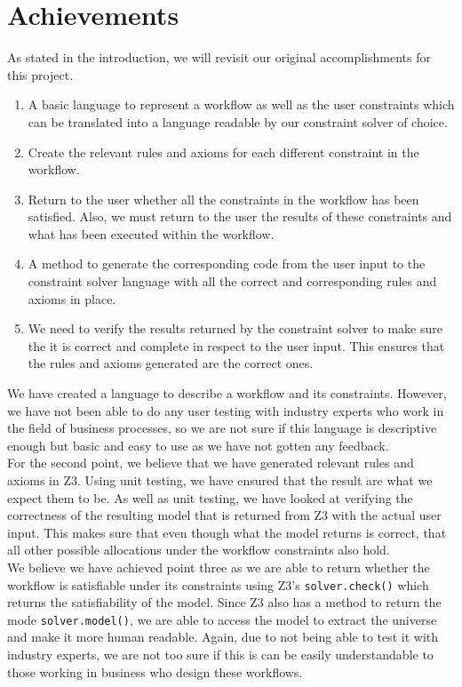 \documentclass[a4paper]{report}
\begin{document}
\section{Achievements}
As stated in the introduction, we will revisit our original accomplishments for this project.
\begin{enumerate}
\item A basic language to represent a workflow as well as the user constraints which can be translated into a language readable by our constraint solver of choice.
\item Create the relevant rules and axioms for each different constraint in the workflow.
\item Return to the user whether all the constraints in the workflow has been satisfied. Also, we must return to the user the results of these constraints and what has been executed within the workflow.
\item A method to generate the corresponding code from the user input to the constraint solver language with all the correct and corresponding rules and axioms in place. 
\item We need to verify the results returned by the constraint solver to make sure the it is correct and complete in respect to the user input. This ensures that the rules and axioms generated are the correct ones. 
\end{enumerate}

We have created a language to describe  a workflow and its constraints. However, we have not been able to do any user testing with industry experts who work in the field of business processes, so we are not sure if this language is descriptive enough but basic and easy to use as we have not gotten any feedback. \\

For the second point, we believe that we have generated relevant rules and axioms in Z3. Using unit testing, we have ensured that the result are what we expect them to be. As well as unit testing, we have looked at verifying the correctness of the resulting model that is returned from Z3 with the actual user input. This makes sure that even though what the model returns is correct, that all other possible allocations under the workflow constraints also hold. \\

We believe we have achieved point three as we are able to return whether the workflow is satisfiable under its constraints using Z3's \texttt{solver.check()} which returns the satisfiability of the model. Since Z3 also has a method to return the mode \texttt{solver.model()}, we are able to access the model to extract the universe and make it more human readable. Again, due to not being able to test it with industry experts, we are not too sure if this is can be easily understandable to those working in business who design these workflows.  \\
\end{document}
